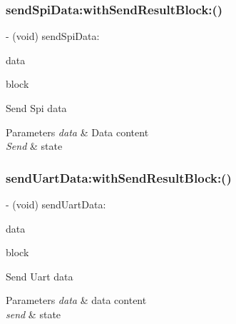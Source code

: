 \subsubsection{\texorpdfstring{send\+Spi\+Data\+:with\+Send\+Result\+Block\+:()}{sendSpiData:withSendResultBlock:()}}
{\footnotesize\ttfamily -\/ (void) send\+Spi\+Data\+: \begin{DoxyParamCaption}\item[{(\hyperlink{struct_p_v_s_d_k___m_o_u_n_t_a_p_i___s_p_i___d_a_t_a}{P\+V\+S\+D\+K\+\_\+\+M\+O\+U\+N\+T\+A\+P\+I\+\_\+\+S\+P\+I\+\_\+\+D\+A\+TA})}]{data }\item[{withSendResultBlock:(P\+V\+Send\+Data\+Result\+Block)}]{block }\end{DoxyParamCaption}}

Send Spi data


\begin{DoxyParams}{Parameters}
{\em data} & Data content \\
\hline
{\em Send} & state \\
\hline
\end{DoxyParams}
\mbox{\label{interface_p_v_mount_controller_a05517169ff58a8eede7a79241c831a56}} 
\subsubsection{\texorpdfstring{send\+Uart\+Data\+:with\+Send\+Result\+Block\+:()}{sendUartData:withSendResultBlock:()}}
{\footnotesize\ttfamily -\/ (void) send\+Uart\+Data\+: \begin{DoxyParamCaption}\item[{(\hyperlink{struct_p_v_s_d_k___m_o_u_n_t_a_p_i___u_a_r_t___d_a_t_a}{P\+V\+S\+D\+K\+\_\+\+M\+O\+U\+N\+T\+A\+P\+I\+\_\+\+U\+A\+R\+T\+\_\+\+D\+A\+TA})}]{data }\item[{withSendResultBlock:(P\+V\+Send\+Data\+Result\+Block)}]{block }\end{DoxyParamCaption}}

Send Uart data


\begin{DoxyParams}{Parameters}
{\em data} & data content \\
\hline
{\em send} & state \\
\hline
\end{DoxyParams}
\mbox{\label{interface_p_v_mount_controller_abd9f7b585150882e4cdfc4c33d9fcc69}} 
